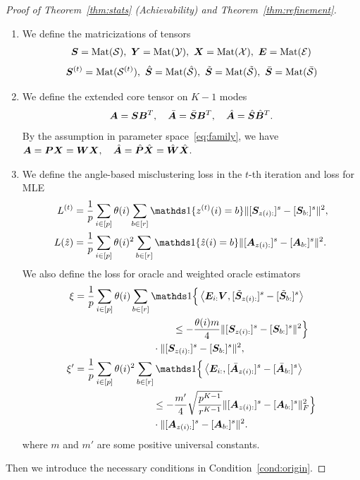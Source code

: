 \documentclass[journal]{IEEEtran}
\theoremstyle{definition}
\theoremstyle{definition}
\newcommand{\ang}[1]{\left\langle#1\right\rangle}
\begin{document}
\begin{proof}[Proof of Theorem~\ref{thm:stats} (Achievability) and Theorem~\ref{thm:refinement}]
{\begin{enumerate}[wide]
    \item We define the matricizations of tensors
    \begin{align}
        \bm S = \text{Mat}(\mathcal{S}), \  \bm Y = \text{Mat}(\mathcal{Y}), \  \bm X = \text{Mat}(\mathcal{X}), \  \bm{E} = \text{Mat}(\mathcal{E})
    \end{align}
    \begin{equation}
        \bm S^{(t)} = \text{Mat}(\mathcal{S}^{(t)}), \   \hat {\bm S} = \text{Mat}(\hat {\mathcal{S}}), \  \tilde {\bm S} = \text{Mat}(\tilde {\mathcal{S}}), \  \bar {\bm S} = \text{Mat}( \bar {\mathcal{S}} )
    \end{equation}
    \item We define the extended core tensor on $K-1$ modes
    \begin{equation}
        \bm A = \bm S \bm B^T , \quad \bar {\bm A} = \bar {\bm S} \bm B^T, \quad \hat {\bm A} = \hat {\bm S} \hat {\bm B}^T.
    \end{equation}
    By the assumption in parameter space~\eqref{eq:family}, we have $\bm A = \bm{P} \bm X = \bm{W} \bm X, \quad \hat {\bm A} = \hat {\bm{P}} \hat {\bm X} = \hat {\bm{W}} \hat {\bm X}.$

    \item We define the angle-based misclustering loss in the $t$-th iteration and loss for MLE
    \begin{align}
        L^{(t)} &= \frac{1}{p}  \sum_{i \in [p]} \theta(i) \sum_{b \in [r]}  \ind \{ z^{(t)}(i) = b \} \onormSize{}{ [ \mS_{ z(i):}  ]^s - [ \mS_{b:}  ]^s  }^2, \\
         L(\hat z)& = \frac{1}{p} \sum_{i \in [p]} \theta(i)^2 \sum_{b \in [r]} \ind\{ \hat z(i) = b\} \onormSize{}{[\mA_{z(i):}]^s - [\mA_{b:}]^s}^2.
    \end{align}
    We also define the loss for oracle and weighted oracle estimators
    \begin{align}
         \xi & = \frac{1}{p} \sum_{i \in [p]} \theta(i) \sum_{b \in [r]} \ind \Big\{\ang{ \mE_{i:} \mV, [  \tilde \mS_{z(i):} ]^s - [  \tilde \mS_{b:} ]^s} \\
         & \quad \quad \quad \quad \quad \quad \quad \quad \quad \quad \leq - \frac{ \theta(i) m}{4} \onormSize{}{ [ \mS_{z(i):}  ]^s - [ \mS_{b:}  ]^s  }^2 \Big\} \\
         & \quad \quad \quad \quad \quad \quad \quad \quad \cdot \onormSize{}{ [ \mS_{z(i):}  ]^s - [ \mS_{ b:}  ]^s  }^2,\\
         \xi' & = \frac{1}{p} \sum_{i \in [p]} \theta(i)^2 \sum_{b \in [r]} \ind \Big\{\ang{\mE_{i:}, [\bar \mA_{z(i):}]^s - [\bar \mA_{b:}]^s } \\
         & \quad \quad \quad \quad \quad \quad \quad \quad  \leq - \frac{m'}{4}  \sqrt{\frac{p^{K-1}}{r^{K-1}}} \onormSize{}{ [\mA_{z(i):}]^s -  [\mA_{b:}]^s  }_F^2 \Big\} \\
         & \quad \quad \quad \quad \quad \quad \quad \quad \cdot \onormSize{}{[\mA_{z(i):}]^s - [\mA_{b:}]^s}^2.
    \end{align}
    where $m$ and $m'$ are some positive universal constants.
\end{enumerate}
Then we introduce the necessary conditions in Condition~\ref{cond:origin}.

}
\end{proof}
\end{document}
